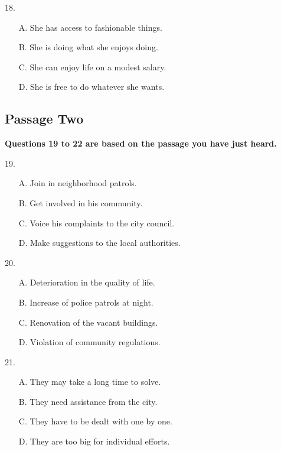 \documentclass[UTF8,11pt]{ctexart}
\begin{document}
18.


\begin{itemize}[leftmargin=2em,itemsep=.2em,topsep=.4em]\item[A.] She has access to fashionable things.
\item[B.] She is doing what she enjoys doing.
\item[C.] She can enjoy life on a modest salary.
\item[D.] She is free to do whatever she wants.
\end{itemize}

\subsection*{\textbf{Passage Two}}


\textbf{Questions 19 to 22 are based on the passage you have just heard.}


19.


\begin{itemize}[leftmargin=2em,itemsep=.2em,topsep=.4em]\item[A.] Join in neighborhood patrols.
\item[B.] Get involved in his community.
\item[C.] Voice his complaints to the city council.
\item[D.] Make suggestions to the local authorities.
\end{itemize}

20.


\begin{itemize}[leftmargin=2em,itemsep=.2em,topsep=.4em]\item[A.] Deterioration in the quality of life.
\item[B.] Increase of police patrols at night.
\item[C.] Renovation of the vacant buildings.
\item[D.] Violation of community regulations.
\end{itemize}

21.


\begin{itemize}[leftmargin=2em,itemsep=.2em,topsep=.4em]\item[A.] They may take a long time to solve.
\item[B.] They need assistance from the city.
\item[C.] They have to be dealt with one by one.
\item[D.] They are too big for individual efforts.
\end{itemize}
\end{document}
